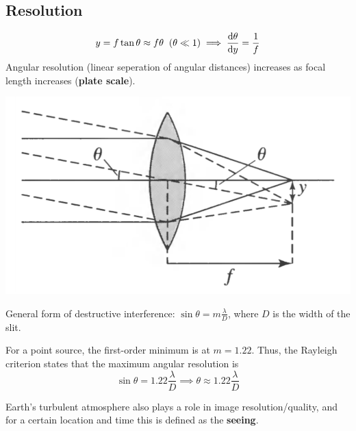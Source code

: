\documentclass[12pt]{article}
\begin{document}
\subsection{Resolution}

    $$ y = f\tan\theta \approx f\theta\;\; (\theta \ll 1) \implies \dv{ \theta}{y} = \frac{1}{f}$$
    Angular resolution (linear seperation of angular distances) increases as focal length increases (\textbf{plate scale}).

    \includegraphics[scale=0.7]{Figures/PlateScale.png}

    General form of destructive interference: $\sin\theta = m\frac{\lambda}{D}$, where $D$ is the width of the slit.

    For a point source, the first-order minimum is at $m = 1.22$. Thus, the Rayleigh criterion states that the maximum angular resolution is $$\sin\theta = 1.22\frac{\lambda}{D} \implies \boxed{\theta \approx 1.22\frac{\lambda}{D}}$$

    Earth's turbulent atmosphere also plays a role in image resolution/quality, and for a certain location and time this is defined as the \textbf{seeing}.
\end{document}

